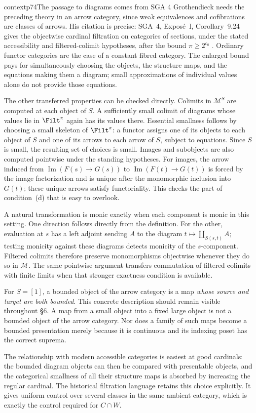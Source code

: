 \begin{dcomment}{context}{p74}{The passage to diagrams comes from SGA 4}
Grothendieck needs the preceding theory in an arrow category, since weak equivalences and cofibrations are classes of arrows. His citation is precise: SGA~4, Expos\'e~I, Corollary~9.24 gives the objectwise cardinal filtration on categories of sections, under the stated accessibility and filtered-colimit hypotheses, after the bound $\pi\geq2^{c_0}$ \citep[Expos\'e~I, 9.22--9.24]{SGA4I1972}. Ordinary functor categories are the case of a constant fibred category. The enlarged bound pays for simultaneously choosing the objects, the structure maps, and the equations making them a diagram; small approximations of individual values alone do not provide those equations.

The other transferred properties can be checked directly. Colimits in $\mathcal M^S$ are computed at each object of $S$. A sufficiently small colimit of diagrams whose values lie in $\Filt^\pi$ again has its values there. Essential smallness follows by choosing a small skeleton of $\Filt^\pi$: a functor assigns one of its objects to each object of $S$ and one of its arrows to each arrow of $S$, subject to equations. Since $S$ is small, the resulting set of choices is small. Images and subobjects are also computed pointwise under the standing hypotheses. For images, the arrow induced from $\operatorname{Im}(F(s)\to G(s))$ to $\operatorname{Im}(F(t)\to G(t))$ is forced by the image factorization and is unique after the monomorphic inclusion into $G(t)$; these unique arrows satisfy functoriality. This checks the part of condition~(d) that is easy to overlook.

A natural transformation is monic exactly when each component is monic in this setting. One direction follows directly from the definition. For the other, evaluation at $s$ has a left adjoint sending $A$ to the diagram $t\mapsto\coprod_{S(s,t)}A$; testing monicity against these diagrams detects monicity of the $s$-component. Filtered colimits therefore preserve monomorphisms objectwise whenever they do so in $\mathcal M$. The same pointwise argument transfers commutation of filtered colimits with finite limits when that stronger exactness condition is available.

For $S=[1]$, a bounded object of the arrow category is a map \emph{whose source and target are both bounded}. This concrete description should remain visible throughout \S6. A map from a small object into a fixed large object is not a bounded object of the arrow category. Nor does a family of such maps become a bounded presentation merely because it is continuous and its indexing poset has the correct suprema.

The relationship with modern accessible categories is easiest at good cardinals: the bounded diagram objects can then be compared with presentable objects, and the categorical smallness of all their structure maps is absorbed by increasing the regular cardinal. The historical filtration language retains this choice explicitly. It gives uniform control over several classes in the same ambient category, which is exactly the control required for $C\cap W$.
\end{dcomment}


